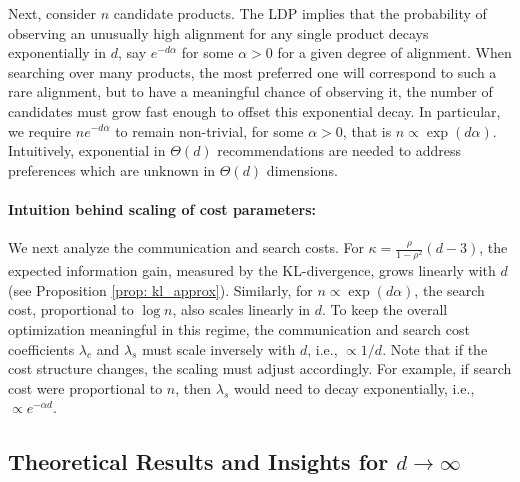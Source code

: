 \documentclass[12pt]{article}
\theoremstyle{definition}
\theoremstyle{remark}
\begin{document}
Next, consider $n$ candidate products. The LDP implies that the probability of observing an unusually high alignment for any single product decays exponentially in $d$, say $e^{-d\alpha}$ for some $\alpha > 0$ for a  given degree of alignment. When searching over many products, the most preferred one will correspond to such a rare alignment, but to have a meaningful chance of observing it, the number of candidates must grow fast enough to offset this exponential decay. In particular, we require $ne^{-d\alpha}$ to remain non-trivial, for some $\alpha>0$, that is $n \propto \exp(d\alpha)$. Intuitively, exponential in $\Theta(d)$ recommendations are needed to address preferences which are unknown in $\Theta(d)$ dimensions.

\paragraph{Intuition behind scaling of cost parameters:} We next analyze the communication and search costs. For $\kappa=\frac{\rho}{1-\rho^2}(d-3)$, the expected information gain, measured by the KL-divergence,
grows linearly with $d$ (see Proposition \ref{prop: kl_approx}). Similarly, for $n\propto \exp(d\alpha)$, the search cost, proportional to $\log n$, also scales linearly in $d$. To keep the overall optimization meaningful in this regime, the communication and search cost coefficients $\lambda_c$ and $\lambda_s$ must scale inversely with $d$, i.e., $\propto 1/d$. Note that if the cost structure changes, the scaling must adjust accordingly. For example, if search cost were proportional to $n$, then $\lambda_s$ would need to decay exponentially, i.e., $\propto e^{-\alpha d}$.

\subsection{Theoretical Results and Insights for \texorpdfstring{$d\rightarrow \infty$}{d->infty}}
\label{sec:limiting_d_results}
\end{document}
